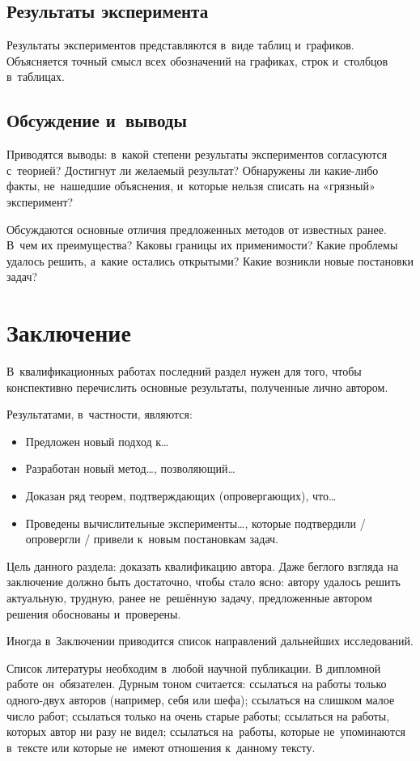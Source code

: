 \documentclass[12pt,fleqn]{article}
\begin{document}
\subsection{Результаты эксперимента}
Результаты экспериментов представляются в~виде таблиц и~графиков.
Объясняется точный смысл всех обозначений на графиках, строк и~столбцов в~таблицах.

\subsection{Обсуждение и~выводы}
Приводятся выводы:
в~какой степени результаты экспериментов согласуются с~теорией?
Достигнут ли желаемый результат?
Обнаружены ли какие-либо факты, не~нашедшие объяснения, и~которые нельзя списать на «грязный» эксперимент?

Обсуждаются основные отличия предложенных методов от известных ранее.
В~чем их преимущества?
Каковы границы их применимости?
Какие проблемы удалось решить, а~какие остались открытыми?
Какие возникли новые постановки задач?

\section{Заключение}

В~квалификационных работах последний раздел нужен для того, чтобы
конспективно перечислить основные результаты, полученные лично автором.

Результатами, в~частности, являются:
\begin{itemize}
\item
    Предложен новый подход к\dots
\item
    Разработан новый метод\dots, позволяющий\dots
\item
    Доказан ряд теорем, подтверждающих (опровергающих), что\dots
\item
    Проведены вычислительные эксперименты\dots,
    которые подтвердили / опровергли / привели к~новым постановкам задач.
\end{itemize}

Цель данного раздела: доказать квалификацию автора.
Даже беглого взгляда на заключение должно быть достаточно, чтобы стало ясно:
автору удалось решить актуальную, трудную, ранее не~решённую задачу,
предложенные автором решения обоснованы и~проверены.

Иногда в~Заключении приводится список направлений дальнейших исследований.

\newpage
Список литературы необходим в~любой научной публикации.
В дипломной работе он~обязателен.
Дурным тоном считается:
ссылаться на работы только одного-двух авторов (например, себя или шефа);
ссылаться на слишком малое число работ;
ссылаться только на очень старые работы;
ссылаться на работы, которых автор ни разу не видел;
ссылаться на~работы, которые не~упоминаются в~тексте
или которые не~имеют отношения к~данному тексту.
\end{document}
